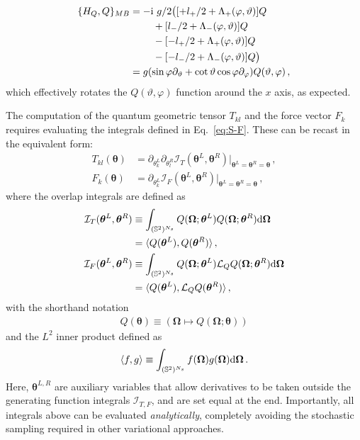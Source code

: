 \documentclass[aps,prl,twocolumn,superscriptaddress,english,floatfix]{revtex4-2}
\newcommand{\vect}[1]{\boldsymbol{#1}}
\renewcommand{\vec}[1]{\vect{#1}}
\def\rmi{{\rm {i}}}
\renewcommand{\d}{{\rm {d}}}
\newcommand{\Omegavec}{\vec{\Omega}}
\newcommand{\thetavec}{{\vec{\theta}}}
\newcommand{\Ical}{\mathcal{I}}
\newcommand{\lcal}{\mathcal{L}}
\newcommand{\bea}{\begin{equation}\begin{aligned}}
\newcommand{\eea}{\end{aligned}\end{equation}}
\begin{document}
\bea
    \{H_Q,Q\}_{MB} &= -\rmi \ g/2\big( [+ l_{+} / 2+\Lambda_{+}(\varphi, \vartheta)]Q\\&\phantom{===} + [l_{-} / 2+\Lambda_{-}(\varphi, \vartheta)]Q\\
    &\phantom{===}- [- l_{+} / 2+\Lambda_{+}(\varphi, \vartheta)]Q\\
    &\phantom{===}- [- l_{-} / 2+\Lambda_{-}(\varphi, \vartheta)]Q\big)\\
    &=g(\sin \varphi \partial_{\vartheta}+\cot \vartheta  \cos \varphi \partial_{\varphi} )Q(\vartheta ,\varphi )\,,
\eea
which effectively rotates the $Q(\vartheta,\varphi)$ function around the $x$ axis, as expected.

The computation of the quantum geometric tensor $T_{kl}$ and the force vector $F_k$ requires evaluating the integrals defined in Eq.~\eqref{eq:S-F}. These can be recast in the equivalent form:
\bea
    T_{kl}(\thetavec) &= \partial_{\theta^L_k}\partial_{\theta^R_l}\Ical_T(\thetavec^L,\thetavec^R)|_{\thetavec^{L}=\thetavec^R=\thetavec}\,,\\
    F_k(\thetavec) &= \partial_{\theta^L_k}\Ical_F(\thetavec^L,\thetavec^R)|_{\thetavec^{L}=\thetavec^R=\thetavec}\,,
\eea
where the overlap integrals are defined as
\bea
    \Ical_T(\thetavec^L,\thetavec^R) &\equiv \int_{(\mathbb{S}^2)^{N_s}}Q(\Omegavec;\thetavec^L)Q(\Omegavec;\thetavec^R)\d\Omegavec\\
    &= \langle Q(\thetavec^L),Q(\thetavec^R)\rangle\,,\\
    \Ical_F(\thetavec^L,\thetavec^R) &\equiv \int_{(\mathbb{S}^2)^{N_s}} Q(\Omegavec;\thetavec^L)\lcal_Q Q(\Omegavec;\thetavec^R)\d\Omegavec\\
    &= \langle Q(\thetavec^L),\lcal_Q Q(\thetavec^R)\rangle\,,
\eea
with the shorthand notation
\bea
    Q(\thetavec) \equiv ( \Omegavec \mapsto Q(\Omegavec;\thetavec) )
\eea
and the $L^2$ inner product defined as
\bea
    \langle f,g \rangle \equiv \int_{(\mathbb{S}^2)^{N_s}} f(\Omegavec)g(\Omegavec)\d\Omegavec\,.
\eea
Here, $\thetavec^{L,R}$ are auxiliary variables that allow derivatives to be taken outside the generating function integrals $\Ical_{T,F}$, and are set equal at the end. Importantly, all integrals above can be evaluated \textit{analytically}, completely avoiding the stochastic sampling required in other variational approaches.
\end{document}
